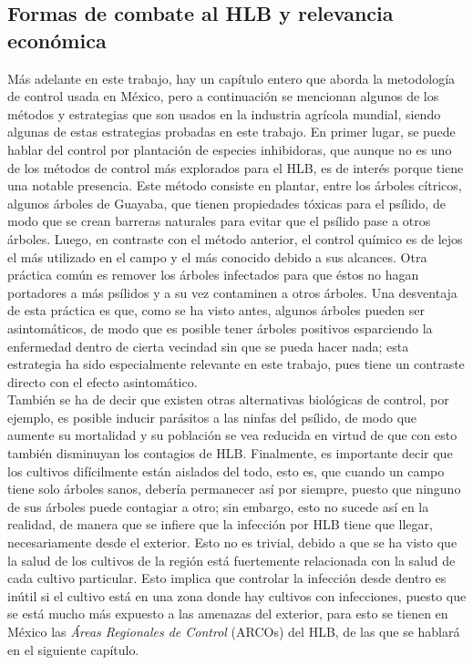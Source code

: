 \subsection{Formas de combate al HLB y relevancia económica}
Más adelante en este trabajo, hay un capítulo entero que aborda la metodología de control usada en México, pero a continuación se mencionan algunos de los métodos y estrategias que son usados en la industria agrícola mundial, siendo algunas de estas estrategias probadas en este trabajo. En primer lugar, se puede hablar del control por plantación de especies inhibidoras, que aunque no es uno de los métodos de control más explorados para el HLB, es de interés porque tiene una notable presencia. Este método consiste en plantar, entre los árboles cítricos, algunos árboles de Guayaba, que tienen propiedades tóxicas para el psílido, de modo que se crean barreras naturales para evitar que el psílido pase a otros árboles. Luego, en contraste con el método anterior, el control químico es de lejos el más utilizado en el campo y el más conocido debido a sus alcances. Otra práctica común es remover los árboles infectados para que éstos no hagan portadores a más psílidos y a su vez contaminen a otros árboles. Una desventaja de esta práctica es que, como se ha visto antes, algunos árboles pueden ser asintomáticos, de modo que es posible tener árboles positivos esparciendo la enfermedad dentro de cierta vecindad sin que se pueda hacer nada; esta estrategia ha sido especialmente relevante en este trabajo, pues tiene un contraste directo con el efecto asintomático.\\
También se ha de decir que existen otras alternativas biológicas de control, por ejemplo, es posible inducir parásitos a las ninfas del psílido, de modo que aumente su mortalidad y su población se vea reducida en virtud de que con esto también disminuyan los contagios de HLB. Finalmente,  es importante decir que los cultivos difícilmente están aislados del todo, esto es, que cuando un campo tiene solo árboles sanos, debería permanecer así por siempre, puesto que ninguno de sus árboles puede contagiar a otro; sin embargo, esto no sucede así en la realidad, de manera que se infiere que la infección por HLB tiene que llegar, necesariamente desde el exterior. Esto no es trivial, debido a que se ha visto que la salud de los cultivos de la región está fuertemente relacionada con la salud de cada cultivo particular\cite{robles2012protocolo}. Esto implica que controlar la infección desde dentro es inútil si el cultivo está en una zona donde hay cultivos con infecciones, puesto que se está mucho más expuesto a las amenazas del exterior, para esto se tienen en México las \textit{Áreas Regionales de Control} (ARCOs) del HLB, de las que se hablará en el siguiente capítulo.

